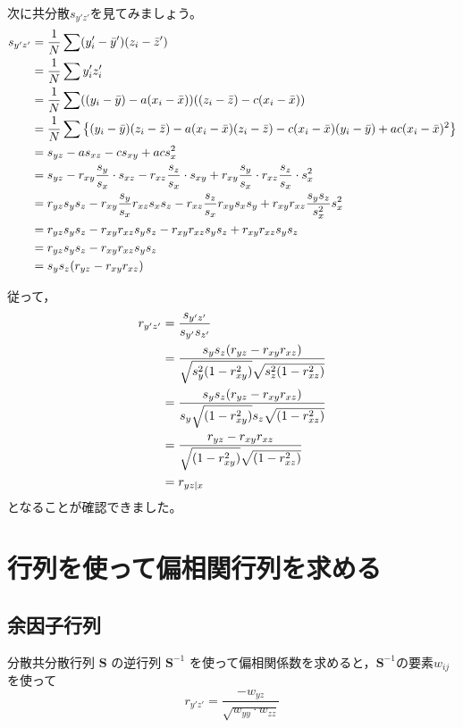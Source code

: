 \documentclass[dvipsnames]{ltjsarticle}
\begin{document}
次に共分散$s_{y'z'}$を見てみましょう。
\begin{align}
s_{y'z'} &= \frac{1}{N} \sum (y_i' - \bar{y}')(z_i - \bar{z}') \notag\\
        & = \frac{1}{N} \sum y_i' z_i'                          \notag\\
        &= \frac{1}{N} \sum ((y_i - \bar{y}) - a(x_i - \bar{x}))((z_i - \bar{z}) - c(x_i - \bar{x}))                                                \notag\\
        &= \frac{1}{N} \sum \left\{ (y_i - \bar{y})(z_i - \bar{z}) - a(x_i - \bar{x})(z_i - \bar{z}) - c(x_i - \bar{x})(y_i - \bar{y}) + ac(x_i - \bar{x})^2 \right\} \notag\\
        & = s_{yz} - as_{xz} - cs_{xy} + acs_x^2        \notag\\
        & = s_{yz} - r_{xy} \frac{s_y}{s_x} \cdot s_{xz} - r_{xz} \frac{s_z}{s_x} \cdot s_{xy} + r_{xy} \frac{s_y}{s_x} \cdot r_{xz} \frac{s_z}{s_x} \cdot s_x^2    \notag\\
        & = r_{yz}s_ys_z - r_{xy}\frac{s_y}{s_x}r_{xz}s_xs_z - r_{xz}\frac{s_z}{s_x}r_{xy}s_xs_y + r_{xy}r_{xz}\frac{s_ys_z}{s_x^2}s_x^2 \notag \\
        & = r_{yz}s_ys_z -r_{xy}r_{xz}s_ys_z - r_{xy}r_{xz}s_ys_z + r_{xy}r_{xz}s_ys_z \notag\\
        & = r_{yz}s_ys_z - r_{xy} r_{xz} s_y s_z  \notag\\
        & = s_ys_z (r_{yz} - r_{xy} r_{xz})
\end{align}

従って，
\begin{align}
r_{y'z'} &= \frac{s_{y'z'}}{s_{y'} s_{z'}} \notag \\
        & = \frac{s_ys_z (r_{yz} - r_{xy} r_{xz})}{\sqrt{s_y^2 (1 - r_{xy}^2)} \sqrt{s_z^2 (1 - r_{xz}^2)}} \notag\\
        & = \frac{s_y s_z (r_{yz} - r_{xy} r_{xz})}{s_y \sqrt{(1 - r_{xy}^2)} s_z \sqrt{(1 - r_{xz}^2)}} \notag\\
        &= \frac{r_{yz} - r_{xy} r_{xz}}{\sqrt{(1 - r_{xy}^2)} \sqrt{(1 - r_{xz}^2)}} \notag\\
        & = r_{yz|x}
\end{align}
となることが確認できました。


\section{行列を使って偏相関行列を求める}
\subsection{余因子行列}
分散共分散行列 $\bm{S}$ の逆行列 $\bm{S}^{-1}$ を使って偏相関係数を求めると，$\bm{S}^{-1}$の要素$w_{ij}$を使って
\[
r_{y'z'} = \frac{-w_{yz}}{\sqrt{w_{yy} \cdot w_{zz}}} 
\]
\end{document}
